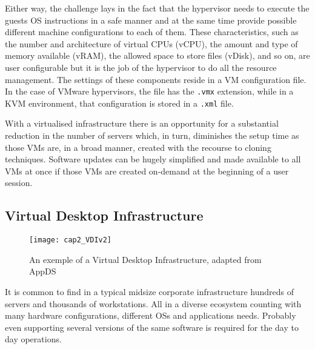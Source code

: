 Either way, the challenge lays in the fact that the hypervisor needs to execute the guests OS instructions in a safe manner and at the same time provide possible different machine configurations to each of them. These characteristics, such as the number and architecture of virtual CPUs (vCPU), the amount and type of memory available (vRAM), the allowed space to store files (vDisk), and so on, are user configurable but it is the job of the hypervisor to do all the resource management. The settings of these components reside in a VM configuration file. In the case of VMware hypervisors, the file has the \texttt{.vmx} extension,\cite{VMWare_VMFiles,Portnoy2012} while in a KVM environment, that configuration is stored in a \texttt{.xml} file.~\cite{chirammal2016}

With a virtualised infrastructure there is an opportunity for a substantial reduction in the number of servers which, in turn, diminishes the setup time as those VMs are, in a broad manner, created with the recourse to cloning techniques. Software updates can be hugely simplified and made available to all VMs at once if those VMs are created on-demand at the beginning of a user session. 



\subsection{Virtual Desktop Infrastructure} %
\label{sub:vdi}

\begin{figure}[htbp]
	\centering
	\texttt{[image: cap2\_VDIv2]}
	\caption{An exemple of a Virtual Desktop Infrastructure, adapted from AppDS~\cite{appds_2017}}
	\label{fig:VDI}
\end{figure}

It is common to find in a typical midsize corporate infrastructure hundreds of servers and thousands of workstations. All in a diverse ecosystem counting with many hardware configurations, different OSs and applications needs. Probably even supporting several versions of the same software is required for the day to day operations.

